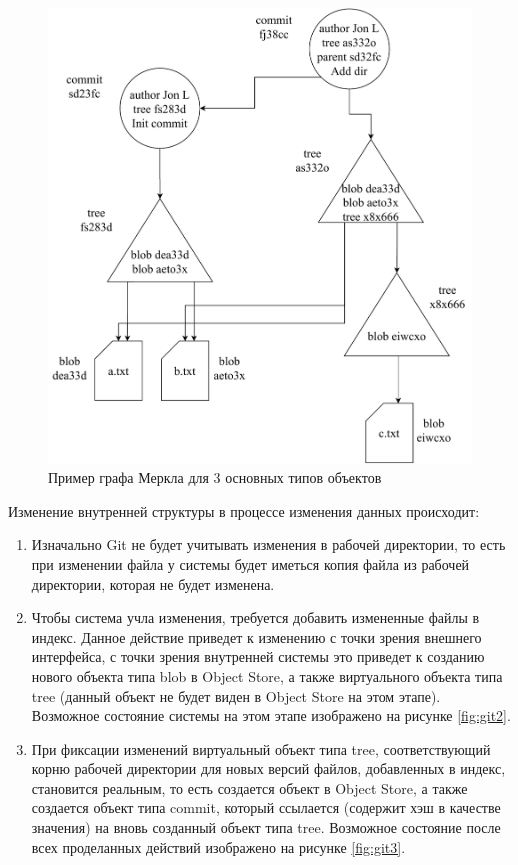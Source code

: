 \begin{figure}[hbtp]
    \centering
    \includegraphics[width=\textwidth]{./img/git-mdag.pdf}
    \caption{Пример графа Меркла для 3 основных типов объектов}
    \label{fig:git1}
\end{figure}

Изменение внутренней структуры в процессе изменения данных происходит:
\begin{enumerate}
    \item Изначально Git не будет учитывать изменения в рабочей директории, то есть при изменении файла у системы будет иметься копия файла из рабочей директории, которая не будет изменена.
    \item Чтобы система учла изменения, требуется добавить измененные файлы в индекс. Данное действие приведет к изменению с точки зрения внешнего интерфейса, с точки зрения внутренней системы это приведет к созданию нового объекта типа blob в Object Store, а также виртуального объекта типа tree (данный объект не будет виден в Object Store на этом этапе). Возможное состояние системы на этом этапе изображено на рисунке \ref{fig:git2}.
    \item При фиксации изменений виртуальный объект типа tree, соответствующий корню рабочей директории для новых версий файлов, добавленных в индекс, становится реальным, то есть создается объект в Object Store, а также создается объект типа commit, который ссылается (содержит хэш в качестве значения) на вновь созданный объект типа tree. Возможное состояние после всех проделанных действий изображено на рисунке \ref{fig:git3}.
\end{enumerate}

